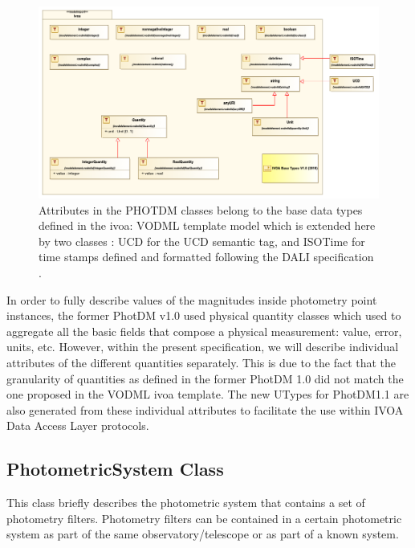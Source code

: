 \documentclass[11pt,a4paper]{ivoa}
\begin{document}
\begin{figure}[H]
\includegraphics[angle=0,width=5.98in ]{./schema/BaseDataTypesDiagram_PR_20220520.png}
\caption{Attributes in the PHOTDM classes belong to the base data types defined in the ivoa: VODML template model which is extended here by two classes : UCD for the UCD semantic tag, and ISOTime for time stamps defined and formatted following the DALI specification \citep{2017ivoa.spec.0517D} .}
\end{figure}





\newpage


\newpage
In order to fully describe values of the magnitudes inside photometry point
instances, the former PhotDM v1.0 used  physical quantity classes which used to
aggregate all the basic fields that compose a physical measurement: value,
error, units, etc. However, within the present specification, we will describe
individual attributes of the different quantities separately.
This is due to the fact that the granularity of quantities as defined in the former PhotDM 1.0
did not match the one proposed in the VODML ivoa template. The new UTypes for PhotDM1.1 are also
generated from these individual attributes to facilitate the use within IVOA Data Access Layer protocols.

\par

\subsection{PhotometricSystem Class}
This class briefly describes the photometric system that contains a set of
photometry filters. Photometry filters can be contained in a certain
photometric system as part of the same observatory/telescope or as part
of a known system.
\par
\end{document}
